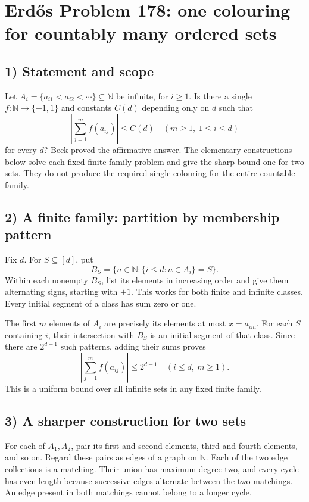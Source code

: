 \section{Erd\H{o}s Problem 178: one colouring for countably many ordered sets}

\subsection{1) Statement and scope}
Let $A_i=\{a_{i1}<a_{i2}<\cdots\}\subseteq\mathbb N$ be infinite,
for $i\geq1$. Is there a single $f:\mathbb N\to\{-1,1\}$ and constants
$C(d)$ depending only on $d$ such that
\[
 \left|\sum_{j=1}^m f(a_{ij})\right|\leq C(d)
 \quad(m\geq1,\ 1\leq i\leq d)
\]
for every $d$? Beck proved the affirmative answer. The elementary
constructions below solve each fixed finite-family problem and give
the sharp bound one for two sets. They do not produce the required
single colouring for the entire countable family.

\subsection{2) A finite family: partition by membership pattern}
Fix $d$. For $S\subseteq[d]$, put
\[
 B_S=\{n\in\mathbb N:\{i\leq d:n\in A_i\}=S\}.
\]
Within each nonempty $B_S$, list its elements in increasing order and
give them alternating signs, starting with $+1$. This works for both
finite and infinite classes. Every initial segment of a class has sum
zero or one.

The first $m$ elements of $A_i$ are precisely its elements at most
$x=a_{im}$. For each $S$ containing $i$, their intersection with $B_S$
is an initial segment of that class. Since there are $2^{d-1}$ such
patterns, adding their sums proves
\[
 \left|\sum_{j=1}^m f(a_{ij})\right|\leq2^{d-1}
 \quad(i\leq d,\ m\geq1).                              \tag{1}
\]
This is a uniform bound over all infinite sets in any fixed finite family.

\subsection{3) A sharper construction for two sets}
For each of $A_1,A_2$, pair its first and second elements, third and
fourth elements, and so on. Regard these pairs as edges of a graph on
$\mathbb N$. Each of the two edge collections is a matching. Their
union has maximum degree two, and every cycle has even length because
successive edges alternate between the two matchings. An edge present
in both matchings cannot belong to a longer cycle.

